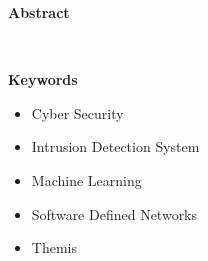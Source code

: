 \thispagestyle{empty}

{\bf\Huge Abstract}

\vspace{1cm}

\lipsum[1-3] \\ \faGithub

\vspace{1cm}

{\bf\Huge Keywords}

\vspace{1cm}

\begin{itemize}
    \item Cyber Security
    \item Intrusion Detection System
    \item Machine Learning
    \item Software Defined Networks
    \item Themis
\end{itemize}